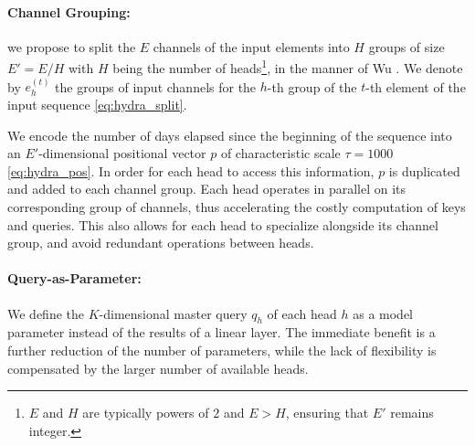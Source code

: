 \documentclass[runningheads]{llncs}
\begin{document}
\paragraph{Channel Grouping:} we propose to split the $E$ channels of the input elements into $H$ groups of size $E'=E/H$ with $H$ being the number of heads\footnote{$E$ and $H$ are typically powers of $2$ and $E>H$, ensuring that $E'$ remains integer.}, in the manner of Wu \etal \cite{wu2018group}. We denote by $e^{(t)}_h$ the groups of input channels for the $h$-th group of the $t$-th element of the input sequence \eqref{eq:hydra_split}.

We encode the number of days elapsed since the beginning of the sequence into an $E'$-dimensional positional vector $p$ of characteristic scale $\tau=1000$ \eqref{eq:hydra_pos}. In order for each head to access this information, $p$ is duplicated and added to each channel group.
Each head operates in parallel on its corresponding group of channels, thus accelerating the costly computation of keys and queries. This also allows for each head to specialize alongside its channel group, and avoid redundant operations between heads.
\paragraph{Query-as-Parameter:}
We define the $K$-dimensional master query $q_h$ of each head $h$ as a model parameter instead of the results of a linear layer. The immediate benefit is a further reduction of the number of parameters, while the lack of flexibility is compensated by the larger number of available heads.
\end{document}
